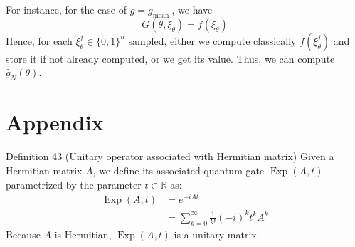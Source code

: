 \begin{example}
For instance, for the case of $g=g_{\text {mean }}$, we have
$$
G\left(\theta, \xi_{\theta}\right)=f\left(\xi_{\theta}\right)
$$
Hence, for each $\xi_{\theta}^{j} \in\{0,1\}^{n}$ sampled, either we compute classically $f\left(\xi_{\theta}^{j}\right)$ and store it if not already computed, or we get its value. Thus, we can compute $\hat{g}_{N}(\theta)$. 
\end{example}



























\section{Appendix}

Definition 43 (Unitary operator associated with Hermitian matrix) Given a Hermitian matrix $A$, we define its associated quantum gate $\operatorname{Exp}(A, t)$ parametrized by the parameter $t \in \mathbb{R}$ as:
$$
\begin{aligned}
\operatorname{Exp}(A, t) & =e^{-i A t} \\
& =\sum_{k=0}^{\infty} \frac{1}{k!}(-i)^{k} t^{k} A^{k}
\end{aligned}
$$
Because $A$ is Hermitian, $\operatorname{Exp}(A, t)$ is a unitary matrix.